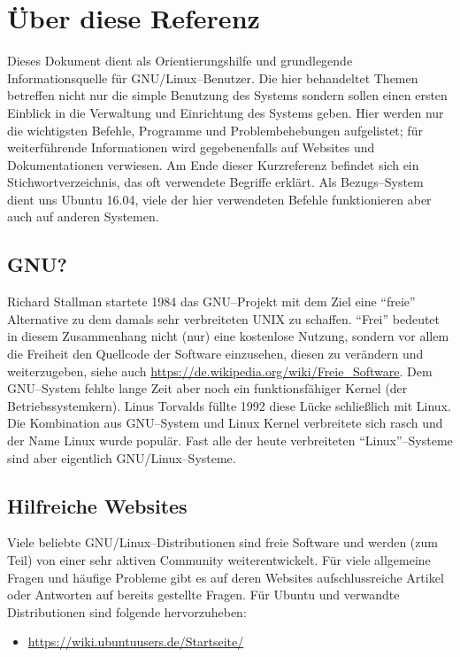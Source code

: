 \section {Über diese Referenz}
Dieses Dokument dient als Orientierungshilfe und grundlegende Informationsquelle für GNU/Linux--Benutzer. Die hier behandeltet Themen betreffen nicht nur die simple Benutzung des Systems sondern sollen einen ersten Einblick in die Verwaltung und Einrichtung des Systems geben. Hier werden nur die wichtigsten Befehle, Programme und Problembehebungen aufgelistet; für weiterführende Informationen wird gegebenenfalls auf Websites und Dokumentationen verwiesen. Am Ende dieser Kurzreferenz befindet sich ein Stichwortverzeichnis, das oft verwendete Begriffe erklärt. Als Bezugs--System dient uns Ubuntu 16.04, viele der hier verwendeten Befehle funktionieren aber auch auf anderen Systemen.

\subsection{GNU?}
Richard Stallman startete 1984 das GNU--Projekt mit dem Ziel eine ``freie'' Alternative zu dem damals sehr verbreiteten UNIX zu schaffen. ``Frei'' bedeutet in diesem Zusammenhang nicht (nur) eine kostenlose Nutzung, sondern vor allem die Freiheit den Quellcode der Software einzusehen, diesen zu verändern und weiterzugeben, siehe auch \url{https://de.wikipedia.org/wiki/Freie_Software}. Dem GNU--System fehlte lange Zeit aber noch ein funktionsfähiger Kernel (der Betriebssystemkern). Linus Torvalds füllte 1992 diese Lücke schließlich mit Linux. Die Kombination aus GNU--System und Linux Kernel verbreitete sich rasch und der Name Linux wurde populär. Fast alle der heute verbreiteten ``Linux''--Systeme sind aber eigentlich GNU/Linux--Systeme.

\subsection {Hilfreiche Websites}
Viele beliebte GNU/Linux--Distributionen sind freie Software und werden (zum Teil) von einer sehr aktiven Community weiterentwickelt. Für viele allgemeine Fragen und häufige Probleme gibt es auf deren Websites aufschlussreiche Artikel oder Antworten auf bereits gestellte Fragen. Für Ubuntu und verwandte Distributionen sind folgende hervorzuheben:

\begin{itemize}
	\item \url{https://wiki.ubuntuusers.de/Startseite/}
\end{itemize}
